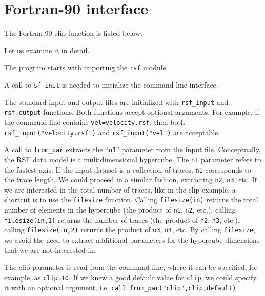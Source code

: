 \section{Fortran-90 interface}

\lstset{language=fortran}
\renewcommand{\rsfclip}{\RSF/api/f90/test/clip.f90}

The Fortran-90 clip function is listed below.



Let us examine it in detail.


The program starts with importing the \texttt{rsf} module.


A call to \texttt{sf\_init} is needed to initialize the command-line
interface.


The standard input and output files are initialized with
\texttt{rsf\_input} and \texttt{rsf\_output} functions. Both functions
accept optional arguments. For example, if the command line contains
\texttt{vel=velocity.rsf}, then both
\texttt{rsf\_input("velocity.rsf")} and \texttt{rsf\_input("vel")} are
acceptable.


A call to \texttt{from\_par} extracts the ``\texttt{n1}'' parameter
from the input file. Conceptually, the RSF data model is a
multidimensional hypercube.  The \texttt{n1} parameter refers to the
fastest axis. If the input dataset is a collection of traces,
\texttt{n1} corresponds to the trace length. We could proceed in a
similar fashion, extracting \texttt{n2}, \texttt{n3}, etc. If we are
interested in the total number of traces, like in the clip example, a
shortcut is to use the \texttt{filesize} function.  Calling
\texttt{filesize(in)} returns the total number of elements in the
hypercube (the product of \texttt{n1}, \texttt{n2}, etc.), calling
\texttt{filesize(in,1)} returns the number of traces (the product of
\texttt{n2}, \texttt{n3}, etc.), calling \texttt{filesize(in,2)}
returns the product of \texttt{n3}, \texttt{n4}, etc. By calling
\texttt{filesize}, we avoid the need to extract additional parameters
for the hypercube dimensions that we are not interested in.


The clip parameter is read from the command line, where it can be
specified, for example, as \texttt{clip=10}. If we knew a good default
value for \texttt{clip}, we could specify it with an optional
argument, i.e. \texttt{call~from\_par("clip",clip,default)}.

